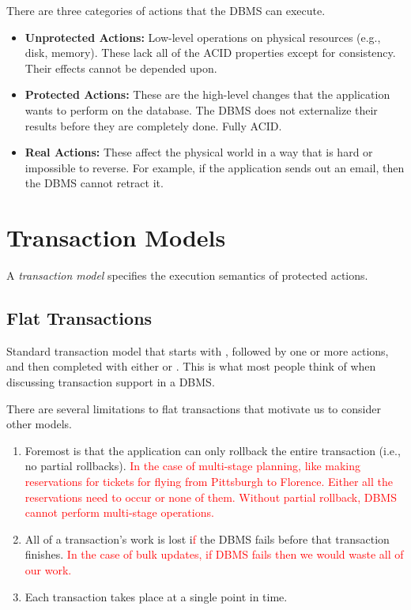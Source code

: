 \documentclass[11pt]{article}
\newcommand{\rr}[1]{\textcolor{red}{#1}}
\begin{document}
There are three categories of actions that the DBMS can execute.
\begin{itemize}
    \item \textbf{Unprotected Actions: }
    Low-level operations on physical resources (e.g., disk, memory). These lack all of the ACID 
    properties except for consistency. Their effects cannot be depended upon.
    
    \item \textbf{Protected Actions: }
    These are the high-level changes that the application wants to perform on the database.
    The DBMS does not externalize their results before they are completely done. Fully ACID.
    
    \item \textbf{Real Actions: }
    These affect the physical world in a way that is hard or impossible to reverse.
    For example, if the application sends out an email, then the DBMS cannot retract it.
\end{itemize}

\section{Transaction Models}
A \textit{transaction model} specifies the execution semantics of protected actions.

\subsection*{Flat Transactions}
Standard transaction model that starts with , followed by one or more actions, and then 
completed with either  or .
This is what most people think of when discussing transaction support in a DBMS.

There are several limitations to flat transactions that motivate us to consider other models.
\begin{enumerate}
    \item Foremost is that the application can only rollback the entire transaction (i.e., no partial 
rollbacks). \rr{In the case of multi-stage planning, like making reservations for tickets for flying from Pittsburgh to Florence. Either all the reservations need to occur or none of them. Without partial rollback, DBMS cannot perform multi-stage operations.}
    \item All of a transaction's work is lost i\rr{f} the DBMS fails before that transaction finishes. \rr{In the case of bulk updates, if DBMS fails then we would waste all of our work.}
    \item Each 
transaction takes place at a single point in time.
\end{enumerate}
\end{document}
